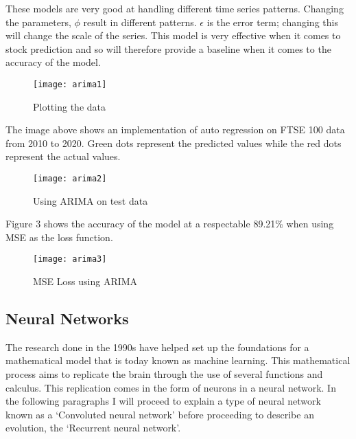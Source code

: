 \documentclass{article}
\begin{document}
These models are very good at handling different time series patterns. Changing the parameters, $\phi$ result in different patterns. $\epsilon$ is the error term; changing this will change the scale of the series. This model is very effective when it comes to stock prediction and so will therefore provide a baseline when it comes to the accuracy of the model.
\begin{figure}[h]
    \centering
    \texttt{[image: arima1]}
    \caption{Plotting the data }
\end{figure}
The image above shows an implementation of auto regression on FTSE 100 data from 2010 to 2020. Green dots represent the predicted values while the red dots represent the actual values.
\clearpage
\begin{figure}[h]
    \centering
    \texttt{[image: arima2]}
    \caption{Using ARIMA on test data }
\end{figure}
Figure 3 shows the accuracy of the model at a respectable 89.21\% when using MSE as the loss function.
\begin{figure}[h]
    \centering
    \texttt{[image: arima3]}
    \caption{MSE Loss using ARIMA }
\end{figure}

\subsection{Neural Networks}
The research done in the 1990s have helped set up the foundations for a mathematical model that is today known as machine learning. This mathematical process aims to replicate the brain through the use of several functions and calculus. This replication comes in the form of neurons in a neural network. In the following paragraphs I will proceed to explain a type of neural network known as a ‘Convoluted neural network’ before proceeding to describe an evolution, the ‘Recurrent neural network’.
\end{document}
